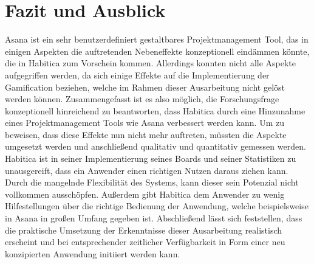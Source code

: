 \documentclass[sigconf, nonacm]{acmart}
\begin{document}
\section{Fazit und Ausblick}\label{sec:fazit}
Asana ist ein sehr benutzerdefiniert gestaltbares Projektmanagement Tool, das in einigen Aspekten die auftretenden Nebeneffekte konzeptionell eindämmen könnte, die in Habitica zum Vorschein kommen. Allerdings konnten nicht alle Aspekte aufgegriffen werden, da sich einige Effekte auf die Implementierung der Gamification beziehen, welche im Rahmen dieser Ausarbeitung nicht gelöst werden können. Zusammengefasst ist es also möglich, die Forschungsfrage konzeptionell hinreichend zu beantworten, dass Habitica durch eine Hinzunahme eines Projektmanagement Tools wie Asana verbessert werden kann. Um zu beweisen, dass diese Effekte nun nicht mehr auftreten, müssten die Aspekte umgesetzt werden und anschließend qualitativ und quantitativ gemessen werden. Habitica ist in seiner Implementierung seines Boards und seiner Statistiken zu unausgereift, dass ein Anwender einen richtigen Nutzen daraus ziehen kann. Durch die mangelnde Flexibilität des Systems, kann dieser sein Potenzial nicht vollkommen ausschöpfen. Außerdem gibt Habitica dem Anwender zu wenig Hilfestellungen über die richtige Bedienung der Anwendung, welche beispielsweise in Asana in großen Umfang gegeben ist.
Abschließend lässt sich feststellen, dass die praktische Umsetzung der Erkenntnisse dieser Ausarbeitung realistisch erscheint und bei entsprechender zeitlicher Verfügbarkeit in Form einer neu konzipierten Anwendung initiiert werden kann.




\end{document}
